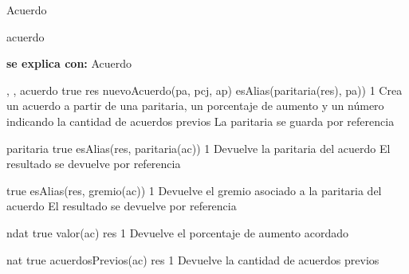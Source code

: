 \begin{interfaz}{Acuerdo}

\begin{iparamformales}{acuerdo}

\textbf{\large se explica con:} Acuerdo

\end{iparamformales}

{, , }{acuerdo}
{true}
{res \igobs nuevoAcuerdo(pa, pcj, ap) \land esAlias(paritaria(res), pa))}
{1}
{Crea un acuerdo a partir de una paritaria, un porcentaje de aumento y un n\'umero indicando la cantidad de acuerdos previos}
{La paritaria se guarda por referencia}

{}{paritaria}
{true}
{esAlias(res, paritaria(ac))}
{1}
{Devuelve la paritaria del acuerdo}
{El resultado se devuelve por referencia}

{true}
{esAlias(res, gremio(ac))}
{1}
{Devuelve el gremio asociado a la paritaria del acuerdo}
{El resultado se devuelve por referencia}

{}{ndat}
{true}
{valor(ac) \igobs res}
{1}
{Devuelve el porcentaje de aumento acordado}
{}

{}{nat}
{true}
{acuerdosPrevios(ac) \igobs res}
{1}
{Devuelve la cantidad de acuerdos previos}
{}

\end{interfaz}